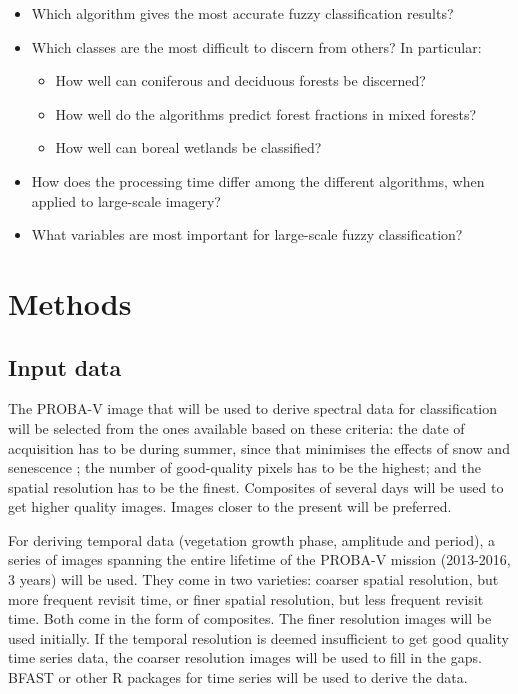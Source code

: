 \documentclass[a4paper,10pt]{article}
\begin{document}
\begin{itemize}
 \item Which algorithm gives the most accurate fuzzy classification results?
 \item Which classes are the most difficult to discern from others? In particular: 
 \begin{itemize}
  \item How well can coniferous and deciduous forests be discerned?
  \item How well do the algorithms predict forest fractions in mixed forests?
  \item How well can boreal wetlands be classified?
 \end{itemize}
 \item How does the processing time differ among the different algorithms, when applied to large-scale imagery?
 \item What variables are most important for large-scale fuzzy classification?
\end{itemize}

\section{Methods}

\subsection{Input data}

The PROBA-V image that will be used to derive spectral data for classification will be selected from the ones available based on these criteria: the date of acquisition has to be during summer, since that minimises the effects of snow and senescence \cite{bartalev2014probavboreal}; the number of good-quality pixels has to be the highest; and the spatial resolution has to be the finest. Composites of several days will be used to get higher quality images. Images closer to the present will be preferred.

For deriving temporal data (vegetation growth phase, amplitude and period), a series of images spanning the entire lifetime of the PROBA-V mission (2013-2016, 3 years) will be used. They come in two varieties: coarser spatial resolution, but more frequent revisit time, or finer spatial resolution, but less frequent revisit time. Both come in the form of composites. The finer resolution images will be used initially. If the temporal resolution is deemed insufficient to get good quality time series data, the coarser resolution images will be used to fill in the gaps. BFAST or other R packages for time series will be used to derive the data.
\end{document}

